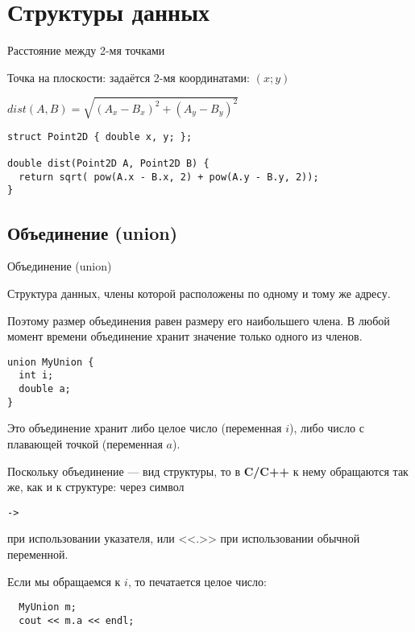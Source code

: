 \section{Структуры данных}

\begin{frame}[t,fragile]{Расстояние между 2-мя точками}

Точка на плоскости: задаётся 2-мя координатами: $(x; y)$

$dist(A, B) = \sqrt{{(A_x - B_x)^2} + {(A_y - B_y)^2}}$

\begin{lstlisting}
struct Point2D { double x, y; };

double dist(Point2D A, Point2D B) {
  return sqrt( pow(A.x - B.x, 2) + pow(A.y - B.y, 2));
}
\end{lstlisting}
\end{frame}

\subsection{Объединение (union)}

\begin{frame}[t,fragile]{Объединение (union)}

Структура данных, 
члены которой расположены по одному и тому же адресу.
 
Поэтому размер объединения равен размеру его наибольшего члена. 
В любой момент времени объединение хранит значение только одного из членов.

\begin{lstlisting}
union MyUnion {
  int i;
  double a;
}
\end{lstlisting}

Это объединение хранит либо целое число (переменная $i$), 
либо число с плавающей точкой (переменная $a$). 

Поскольку объединение --- вид структуры, то в 
\textbf{C/C++} к нему обращаются так же, 
как и к структуре: через символ 
\begin{lstlisting}
-> 
\end{lstlisting}
при использовании указателя, 
или <<.>> при использовании обычной переменной. 

Если мы обращаемся к $i$, то печатается целое число:

\begin{lstlisting}
  MyUnion m;
  cout << m.a << endl;
\end{lstlisting}
\end{frame}

